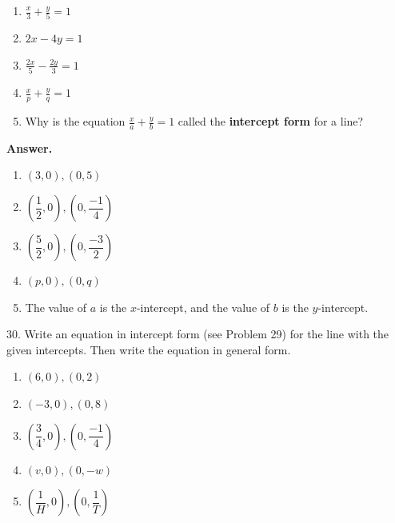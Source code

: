 \documentclass[10pt,]{book}
\newcommand{\terminology}[1]{\textbf{#1}}
\theoremstyle{plain}
\theoremstyle{definition}
\theoremstyle{definition}
\theoremstyle{definition}
\numberwithin{equation}{part}
\begin{document}
\begin{exerciselist}
\begin{multicols}{2}
\begin{enumerate}[label=\alph*]
\item\hypertarget{li-203}{}\(\displaystyle{\frac{x}{3}+\frac{y}{5}=1} \)%
\item\hypertarget{li-204}{}\(\displaystyle{2x - 4y = 1} \)%
\item\hypertarget{li-205}{}\(\displaystyle{\frac{2x}{5}-\frac{2y}{3}=1} \)%
\item\hypertarget{li-206}{}\(\displaystyle{\frac{x}{p}+\frac{y}{q}=1} \)%
\item\hypertarget{li-207}{}Why is the equation \(\displaystyle{\frac{x}{a}+\frac{y}{b}=1} \) called the \terminology{intercept form} for a line?%
\end{enumerate}
\end{multicols}
\par\smallskip
\par\smallskip
\noindent\textbf{Answer.}\hypertarget{answer-22}{}\quad
\leavevmode%
\begin{multicols}{2}
\begin{enumerate}[label=\alph*]
\item\hypertarget{li-208}{}\((3,0), (0,5) \)%
\item\hypertarget{li-209}{}\(\left(\dfrac{1}{2},0\right), \left(0,\dfrac{-1}{4}\right) \)%
\item\hypertarget{li-210}{}\(\left(\dfrac{5}{2},0\right), \left(0,\dfrac{-3}{2}\right) \)%
\item\hypertarget{li-211}{}\((p,0), (0,q) \)%
\item\hypertarget{li-212}{}The value of \(a\) is the \(x\)-intercept, and the value of \(b\) is the \(y\)-intercept.%
\end{enumerate}
\end{multicols}
%
\item[30.]\hypertarget{exercise-37}{}Write an equation in intercept form (see Problem 29) for the line with the given intercepts. Then write the equation in general form.%
\leavevmode%
\begin{multicols}{2}
\begin{enumerate}[label=\alph*]
\item\hypertarget{li-213}{}\((6, 0), (0, 2) \)%
\item\hypertarget{li-214}{}\((-3, 0), (0, 8) \)%
\item\hypertarget{li-215}{}\(\left(\dfrac{3}{4}, 0\right), \left(0, \dfrac{-1}{4}\right) \)%
\item\hypertarget{li-216}{}\((v, 0), (0, -w) \)%
\item\hypertarget{li-217}{}\(\left(\dfrac{1}{H}, 0\right), \left(0, \dfrac{1}{T}\right) \)%

\end{enumerate}
\end{multicols}
\end{exerciselist}
\end{document}
